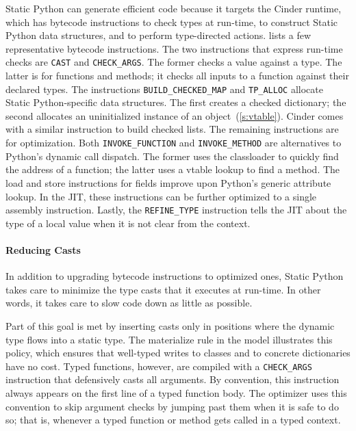 \documentclass[english,cleveref,submission]{programming}
\newcommand{\SP}{Static Python}
\newcommand{\code}[1]{\texttt{#1}}
\newcommand{\bcinst}[1]{\code{#1}}
\begin{document}
\SP{} can generate efficient code because it targets
the Cinder runtime, which has bytecode instructions to check types at run-time, to
construct \SP{} data structures, and to perform type-directed actions.
 lists a few representative bytecode instructions.
The two instructions that express run-time checks are \bcinst{CAST}
and \bcinst{CHECK\_ARGS}.
The former checks a value against a type.
The latter is for functions and methods; it checks all inputs to a function
against their declared types.
The instructions \bcinst{BUILD\_CHECKED\_MAP} and \bcinst{TP\_ALLOC}
allocate \SP{}-specific data structures.
The first creates a checked dictionary; the second allocates an uninitialized instance
of an object~(\cref{s:vtable}).
Cinder comes with a similar instruction to build checked lists.
The remaining instructions are for optimization.
Both \bcinst{INVOKE\_FUNCTION} and \bcinst{INVOKE\_METHOD} are alternatives
to Python's dynamic call dispatch.
The former uses the classloader to quickly find the address of a function;
the latter uses a vtable lookup to find a method.
The load and store instructions for fields improve upon Python's generic attribute lookup.
In the JIT, these instructions can be further optimized to a single assembly instruction.
Lastly, the \bcinst{REFINE\_TYPE} instruction tells the JIT about the type of a local value
when it is not clear from the context.


\paragraph{Reducing Casts}

In addition to upgrading bytecode instructions to optimized ones, \SP{} takes care
to minimize the type casts that it executes at run-time.
In other words, it takes care to slow code down as little as possible.

Part of this goal is met by inserting casts only in positions where the dynamic
type flows into a static type.
The materialize rule in the model illustrates this policy, which ensures that
well-typed writes to classes and to concrete dictionaries have no cost.
Typed functions, however, are compiled with a \bcinst{CHECK\_ARGS} instruction
that defensively casts all arguments.
By convention, this instruction always appears on the first line of a typed
function body.
The optimizer uses this convention to skip argument checks by jumping past them
when it is safe to do so; that is, whenever a typed function or method gets
called in a typed context.
\end{document}
